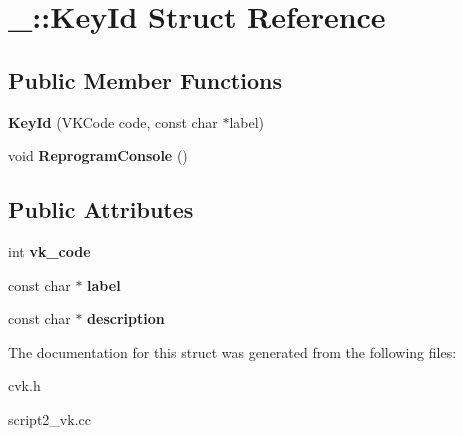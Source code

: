 \hypertarget{struct___1_1_key_id}{}\section{\+\_\+\+:\+:Key\+Id Struct Reference}
\label{struct___1_1_key_id}
\subsection*{Public Member Functions}
\begin{DoxyCompactItemize}
\item 
\mbox{\label{struct___1_1_key_id_afab53d92b982b95325d887b0577d26d3}} 
{\bfseries Key\+Id} (V\+K\+Code code, const char $\ast$label)
\item 
\mbox{\label{struct___1_1_key_id_a405e65a86aca56b2170d73755e16f428}} 
void {\bfseries Reprogram\+Console} ()
\end{DoxyCompactItemize}
\subsection*{Public Attributes}
\begin{DoxyCompactItemize}
\item 
\mbox{\label{struct___1_1_key_id_a36f4e0ed8ccd1e7e1fc57dd09c94efaa}} 
int {\bfseries vk\+\_\+code}
\item 
\mbox{\label{struct___1_1_key_id_a721cdedf1c6461604e013c8a473d657b}} 
const char $\ast$ {\bfseries label}
\item 
\mbox{\label{struct___1_1_key_id_a270e818e63622cd91f5da9fac26c1ce4}} 
const char $\ast$ {\bfseries description}
\end{DoxyCompactItemize}


The documentation for this struct was generated from the following files\+:\begin{DoxyCompactItemize}
\item 
cvk.\+h\item 
script2\+\_\+vk.\+cc\end{DoxyCompactItemize}
